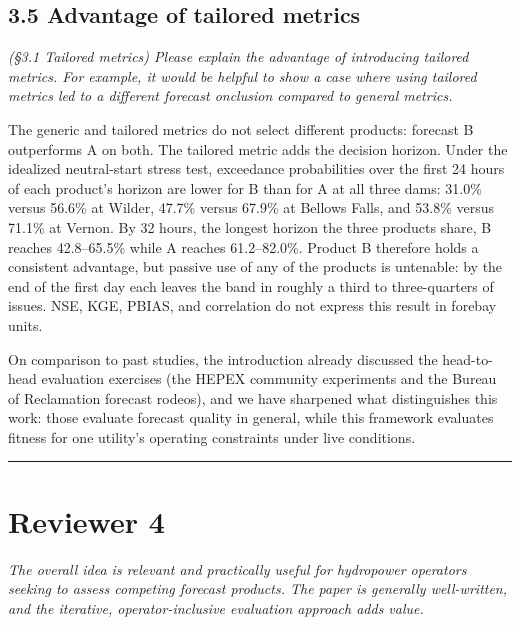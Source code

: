 \documentclass[11pt]{article}
\newenvironment{rc}%
  {\begin{list}{}{\setlength{\leftmargin}{1.5em}\setlength{\rightmargin}{1.5em}%
   \setlength{\topsep}{0.2em}\setlength{\parsep}{0pt}\setlength{\itemsep}{0pt}}%
   \item[]\itshape\color{quotegray}}%
  {\end{list}}
\begin{document}
\subsection*{3.5 Advantage of tailored metrics}

\begin{rc}
(\S3.1 Tailored metrics) Please explain the advantage of introducing tailored metrics. For
example, it would be helpful to show a case where using tailored metrics led to a different
forecast onclusion compared to general metrics.
\end{rc}

The generic and tailored metrics do not select different products: forecast B outperforms A on
both. The tailored metric adds the decision horizon. Under the idealized neutral-start stress
test, exceedance probabilities over the first 24 hours of each product's horizon are lower for B
than for A at all three dams: 31.0\% versus 56.6\% at Wilder, 47.7\% versus 67.9\% at Bellows
Falls, and 53.8\% versus 71.1\% at Vernon. By 32 hours, the longest horizon the three products
share, B reaches 42.8--65.5\% while A reaches 61.2--82.0\%. Product B therefore holds a
consistent advantage, but passive use of any of the products is untenable: by the end of the
first day each leaves the band in roughly a third to three-quarters of issues. NSE, KGE, PBIAS,
and correlation do not express this result in forebay units.

On comparison to past studies, the introduction already discussed the head-to-head evaluation
exercises (the HEPEX community experiments and the Bureau of Reclamation forecast rodeos), and we have
sharpened what distinguishes this work: those evaluate forecast quality in general, while this
framework evaluates fitness for one utility's operating constraints under live conditions.

\vspace{0.4em}
\hrule
\vspace{0.4em}

\section*{Reviewer 4}

\begin{rc}
The overall idea is relevant and practically useful for hydropower operators seeking to assess
competing forecast products. The paper is generally well-written, and the iterative,
operator-inclusive evaluation approach adds value.
\end{rc}
\end{document}
